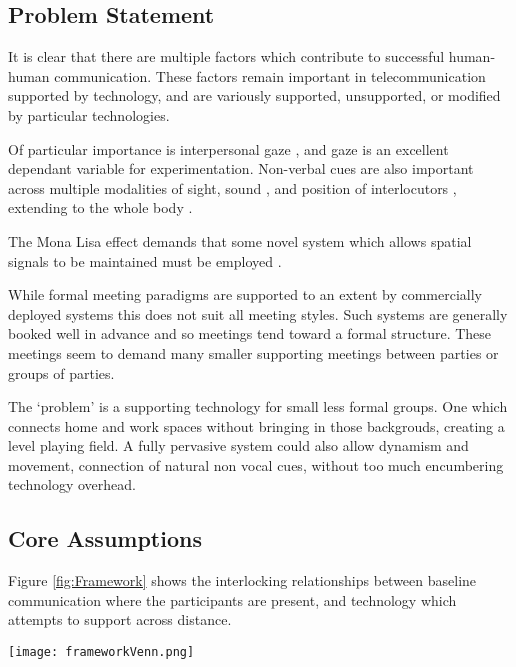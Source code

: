 \subsection{Problem Statement}

        
            It is clear that there are multiple factors which contribute to successful human-human communication. These factors remain important in telecommunication supported by technology, and are variously supported, unsupported, or modified by particular technologies.\par
            Of particular importance is interpersonal gaze \cite{Cook1977, Kleinke1986a, Fagel2010}, and gaze is an excellent dependant variable for experimentation. Non-verbal cues are also important across multiple modalities of sight, sound \cite{Otsuka2005}, and position of interlocutors \cite{Kendon1967}, extending to the whole body \cite{Kleinke1986a, Nguyen2009}.\par
            The Mona Lisa effect demands that some novel system which allows spatial signals to be maintained must be employed \cite{Moubayed2012}.\par
            While formal meeting paradigms are supported to an extent by commercially deployed systems this does not suit all meeting styles. Such systems are generally booked well in advance and so meetings tend toward a formal structure. These meetings seem to demand many smaller supporting meetings between parties or groups of parties.\par
The `problem' is a supporting technology for small less formal groups. One which connects home and work spaces without bringing in those backgrouds, creating a level playing field. A fully pervasive system could also allow dynamism and movement, connection of natural non vocal cues, without too much encumbering technology overhead.
            
            \subsection{Core Assumptions}
                Figure \ref{fig:Framework} shows the interlocking relationships between baseline communication where the participants are present, and technology which attempts to support across distance.
                \begin{figure*}[h]
                \centering
                \texttt{[image: frameworkVenn.png]}
                \caption{The Venn diagram shows areas of research which have been identified in blue. These interlock and overlap as shown. The most relevant identified researchers from the literature are shown in black close to the fields of study which they represent. This diagram is a view of the core assumptions for the research, with the most important fields at the centre. }
                \label{fig:Framework}
                \end{figure*}
                
